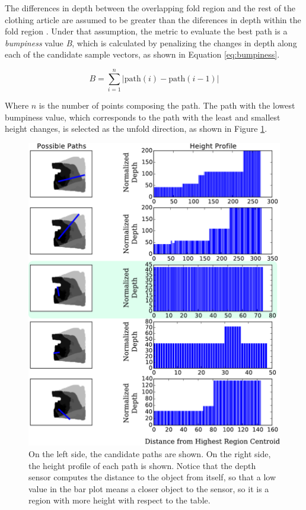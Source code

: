 The differences in depth between the overlapping fold region and the rest of the clothing article are assumed to be greater than the diferences in depth within the fold region . Under that assumption, the metric to evaluate the best path is a \textit{bumpiness} value \textit{B}, which is calculated by penalizing the changes in depth along each of the candidate sample vectors, as shown in Equation \ref{eq:bumpiness}.

\begin{equation}\label{eq:bumpiness}
B = \sum_{i=1}^{n} | \textrm{path}(i)- \textrm{path}(i-1) | 
\end{equation}


Where $n$ is the number of points composing the path. The path with the lowest bumpiness value, which corresponds to the path with the least and smallest height changes, is selected as the unfold direction, as shown in Figure \ref{fig:paths_with_bumpiness}. 

\begin{figure}[thpb]
    \centering
    \includegraphics[width=\textwidth]{figures/candidate_paths.pdf}
    \caption{On the left side, the candidate paths are shown. On the right side, the height profile of each path is shown. Notice that the depth sensor computes the distance to the object from itself, so that a low value in the bar plot means a closer object to the sensor, so it is a region with more height with respect to the table.}
    \label{fig:paths_with_bumpiness}
\end{figure}

